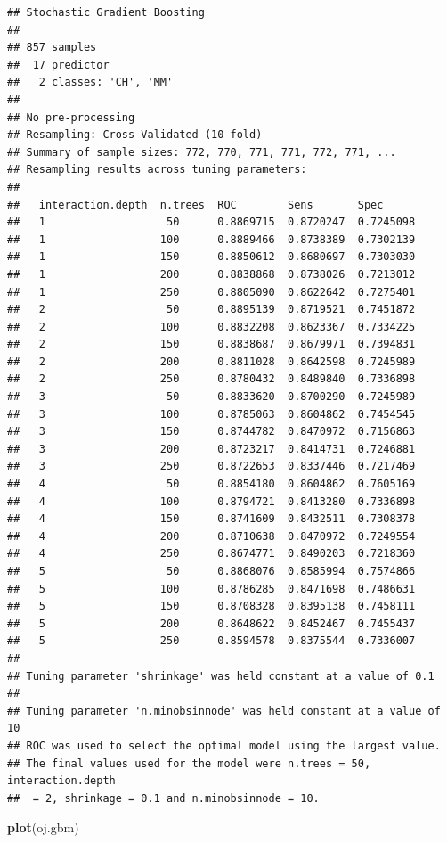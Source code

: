 \documentclass[]{book}
\newenvironment{Shaded}{\begin{snugshade}}{\end{snugshade}}
\newcommand{\KeywordTok}[1]{\textcolor[rgb]{0.13,0.29,0.53}{\textbf{#1}}}
\newcommand{\NormalTok}[1]{#1}
\begin{document}
\begin{verbatim}
## Stochastic Gradient Boosting 
## 
## 857 samples
##  17 predictor
##   2 classes: 'CH', 'MM' 
## 
## No pre-processing
## Resampling: Cross-Validated (10 fold) 
## Summary of sample sizes: 772, 770, 771, 771, 772, 771, ... 
## Resampling results across tuning parameters:
## 
##   interaction.depth  n.trees  ROC        Sens       Spec     
##   1                   50      0.8869715  0.8720247  0.7245098
##   1                  100      0.8889466  0.8738389  0.7302139
##   1                  150      0.8850612  0.8680697  0.7303030
##   1                  200      0.8838868  0.8738026  0.7213012
##   1                  250      0.8805090  0.8622642  0.7275401
##   2                   50      0.8895139  0.8719521  0.7451872
##   2                  100      0.8832208  0.8623367  0.7334225
##   2                  150      0.8838687  0.8679971  0.7394831
##   2                  200      0.8811028  0.8642598  0.7245989
##   2                  250      0.8780432  0.8489840  0.7336898
##   3                   50      0.8833620  0.8700290  0.7245989
##   3                  100      0.8785063  0.8604862  0.7454545
##   3                  150      0.8744782  0.8470972  0.7156863
##   3                  200      0.8723217  0.8414731  0.7246881
##   3                  250      0.8722653  0.8337446  0.7217469
##   4                   50      0.8854180  0.8604862  0.7605169
##   4                  100      0.8794721  0.8413280  0.7336898
##   4                  150      0.8741609  0.8432511  0.7308378
##   4                  200      0.8710638  0.8470972  0.7249554
##   4                  250      0.8674771  0.8490203  0.7218360
##   5                   50      0.8868076  0.8585994  0.7574866
##   5                  100      0.8786285  0.8471698  0.7486631
##   5                  150      0.8708328  0.8395138  0.7458111
##   5                  200      0.8648622  0.8452467  0.7455437
##   5                  250      0.8594578  0.8375544  0.7336007
## 
## Tuning parameter 'shrinkage' was held constant at a value of 0.1
## 
## Tuning parameter 'n.minobsinnode' was held constant at a value of 10
## ROC was used to select the optimal model using the largest value.
## The final values used for the model were n.trees = 50, interaction.depth
##  = 2, shrinkage = 0.1 and n.minobsinnode = 10.
\end{verbatim}

\begin{Shaded}
\begin{Highlighting}[]
\KeywordTok{plot}\NormalTok{(oj.gbm)}
\end{Highlighting}
\end{Shaded}
\end{document}
